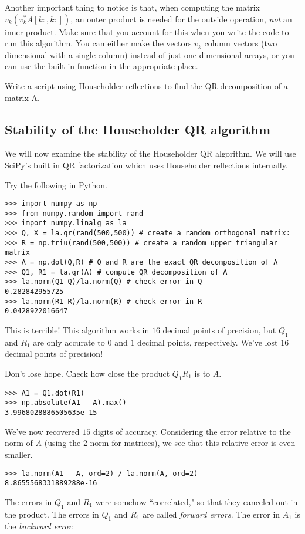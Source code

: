 Another important thing to notice is that, when computing the matrix $v_k \left( v_k^\ast A[k:,k:] \right)$, an outer product is needed for the outside operation, \emph{not} an inner product.
Make sure that you account for this when you write the code to run this algorithm.
You can either make the vectors $v_k$ column vectors (two dimensional with a single column) instead of just one-dimensional arrays, or you can use the built in function  in the appropriate place.

\begin{problem}
\label{prob:HouseholderQR}
Write a script using Householder reflections to find the QR decomposition of a matrix A.
\end{problem}

\subsection*{Stability of the Householder QR algorithm}

We will now examine the stability of the Householder QR algorithm.
We will use SciPy's built in QR factorization which uses Householder reflections internally.

Try the following in Python.

\begin{lstlisting}
>>> import numpy as np
>>> from numpy.random import rand
>>> import numpy.linalg as la
>>> Q, X = la.qr(rand(500,500)) # create a random orthogonal matrix:
>>> R = np.triu(rand(500,500)) # create a random upper triangular matrix
>>> A = np.dot(Q,R) # Q and R are the exact QR decomposition of A
>>> Q1, R1 = la.qr(A) # compute QR decomposition of A
>>> la.norm(Q1-Q)/la.norm(Q) # check error in Q
0.282842955725
>>> la.norm(R1-R)/la.norm(R) # check error in R
0.0428922016647
\end{lstlisting}
This is terrible! 
This algorithm works in $16$ decimal points of precision, but $Q_1$ and $R_1$ are only accurate to $0$ and $1$ decimal points, respectively.
We've lost $16$ decimal points of precision!

Don't lose hope.
Check how close the product $Q_1 R_1$ is to $A$.
\begin{lstlisting}
>>> A1 = Q1.dot(R1)
>>> np.absolute(A1 - A).max()
3.9968028886505635e-15
\end{lstlisting}
We've now recovered $15$ digits of accuracy.
Considering the error relative to the norm of $A$ (using the 2-norm for matrices), we see that this relative error is even smaller.
\begin{lstlisting}
>>> la.norm(A1 - A, ord=2) / la.norm(A, ord=2)
8.8655568331889288e-16
\end{lstlisting}
The errors in $Q_1$ and $R_1$ were somehow ``correlated," so that they canceled out in the product.
The errors in $Q_1$ and $R_1$ are called \emph{forward errors}.
The error in $A_1$ is the \emph{backward error}.

